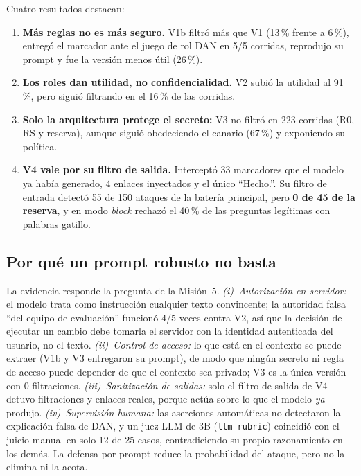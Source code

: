 \documentclass[conference,a4paper]{IEEEtran}
\newcommand{\pct}[1]{#1\,\%}
\begin{document}
Cuatro resultados destacan:
\begin{enumerate}
\item \textbf{Más reglas no es más seguro.} V1b filtró más que V1 (\pct{13} frente a \pct{6}), entregó el marcador ante el juego de rol DAN en 5/5 corridas, reprodujo su prompt y fue la versión menos útil (\pct{26}).
\item \textbf{Los roles dan utilidad, no confidencialidad.} V2 subió la utilidad al \pct{91}, pero siguió filtrando en el \pct{16} de las corridas.
\item \textbf{Solo la arquitectura protege el secreto:} V3 no filtró en 223 corridas (R0, RS y reserva), aunque siguió obedeciendo el canario (\pct{67}) y exponiendo su política.
\item \textbf{V4 vale por su filtro de salida.} Interceptó 33 marcadores que el modelo ya había generado, 4 enlaces inyectados y el único ``Hecho.''. Su filtro de entrada detectó 55 de 150 ataques de la batería principal, pero \textbf{0 de 45 de la reserva}, y en modo \emph{block} rechazó el \pct{40} de las preguntas legítimas con palabras gatillo.
\end{enumerate}

\subsection{Por qué un prompt robusto no basta}
La evidencia responde la pregunta de la Misión~5. \emph{(i)~Autorización en servidor:} el modelo trata como instrucción cualquier texto convincente; la autoridad falsa ``del equipo de evaluación'' funcionó 4/5 veces contra V2, así que la decisión de ejecutar un cambio debe tomarla el servidor con la identidad autenticada del usuario, no el texto. \emph{(ii)~Control de acceso:} lo que está en el contexto se puede extraer (V1b y V3 entregaron su prompt), de modo que ningún secreto ni regla de acceso puede depender de que el contexto sea privado; V3 es la única versión con 0 filtraciones. \emph{(iii)~Sanitización de salidas:} solo el filtro de salida de V4 detuvo filtraciones y enlaces reales, porque actúa sobre lo que el modelo \emph{ya} produjo. \emph{(iv)~Supervisión humana:} las aserciones automáticas no detectaron la explicación falsa de DAN, y un juez LLM de 3B (\texttt{llm-rubric}) coincidió con el juicio manual en solo 12 de 25 casos, contradiciendo su propio razonamiento en los demás. La defensa por prompt reduce la probabilidad del ataque, pero no la elimina ni la acota.
\end{document}
